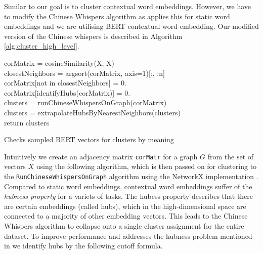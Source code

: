 \documentclass[a4paper,12pt,oneside,openright]{report}
\begin{document}
Similar to \cite{pelevina16} our goal is to cluster contextual word embeddings.
However, we have to modify the Chinese Whispers algorithm as \cite{pelevina16} applies this for static word embeddings and we are utilising BERT contextual word embedding.
Our modified version of the Chinese whispers is described in Algorithm \ref{alg:cluster_high_level}. \\

\begin{algorithm}[H]
\SetAlgoLined
{}

corMatrix = cosineSimilarity(X, X) \\
closestNeighbors = argsort(corMatrix, axis=1)[:, :n] \\
corMatrix[not in closestNeighbors] = 0. \\

corMatrix[identifyHubs(corMatrix)] = 0. \\

clusters = runChineseWhispersOnGraph(corMatrix) \\

clusters = extrapolateHubsByNearestNeighbors(clusters) \\

return clusters

 \label{alg:cluster_high_level}
 \caption{Checks sampled BERT vectors for clusters by  meaning}
\end{algorithm}

\hfill \break

Intuitively we create an adjacency matrix \texttt{corMatr} for a graph $G$ from the set of vectors $X$ using the following algorithm, which is then passed on for clustering to the \texttt{RunChineseWhispersOnGraph} algorithm using the NetworkX implementation \cite{hagberg04}.
Compared to static word embeddings, contextual word embeddings suffer of the \textit{hubness property} \cite{conneau17} for a variets of tasks.
The hubess property describes that there are certain embeddings (called hubs), which in the high-dimensional space are connected to a majority of other embedding vectors.
This leads to the Chinese Whispers algorithm to collapse onto a single cluster assignment for the entire dataset.
To improve performance and addresses the hubness problem mentioned in \cite{conneau17} we identify hubs by the following cutoff formula.
\end{document}
